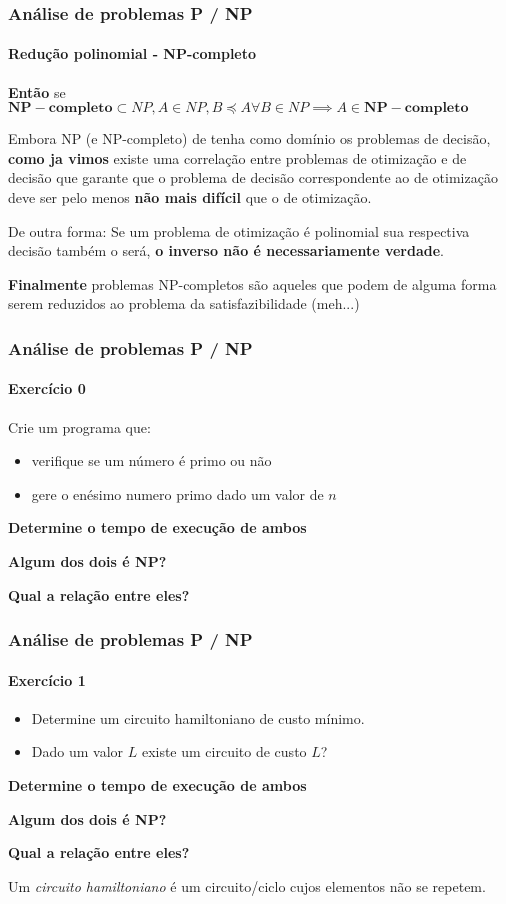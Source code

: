 \begin{frame}
	\frametitle{Análise de problemas P / NP}
	\framesubtitle{Redução polinomial - NP-completo}
	\par \textbf{Então} se $\mathbf{NP-completo} \subset NP, A \in NP, B \preceq A \forall B \in NP \implies A \in \mathbf{NP-completo}$\newline
	\par Embora NP (e NP-completo) de tenha como domínio os problemas de decisão, \textbf{como ja vimos} existe uma correlação entre problemas de otimização e de decisão que garante que o problema de decisão correspondente ao de otimização deve ser pelo menos \textbf{não mais difícil} que o de otimização. 
	\par De outra forma: Se um problema de otimização é polinomial sua respectiva decisão também o será, \textbf{o inverso não é necessariamente verdade}.
	
	\par \textbf{Finalmente} problemas NP-completos são aqueles que podem de alguma forma serem reduzidos ao problema da satisfazibilidade (meh...)
\end{frame}

\begin{frame}
	\frametitle{Análise de problemas P / NP}
	\framesubtitle{Exercício 0}
	\par Crie um programa que:
	\begin{itemize}
		\item verifique se um número é primo ou não
		\item gere o enésimo numero primo dado um valor de $n$
	\end{itemize}
	\par \textbf{Determine o tempo de execução de ambos}
	\par \textbf{Algum dos dois é NP?}
	\par \textbf{Qual a relação entre eles?}
\end{frame}

\begin{frame}
	\frametitle{Análise de problemas P / NP}
	\framesubtitle{Exercício 1}
	\begin{itemize}
		\item Determine um circuito hamiltoniano de custo mínimo.
		\item Dado um valor $L$ existe um circuito de custo $L$?
	\end{itemize}
	\par \textbf{Determine o tempo de execução de ambos}
	\par \textbf{Algum dos dois é NP?}
	\par \textbf{Qual a relação entre eles?}\newline
	
	\par Um \textit{circuito hamiltoniano} é um circuito/ciclo cujos elementos não se repetem.
\end{frame}

